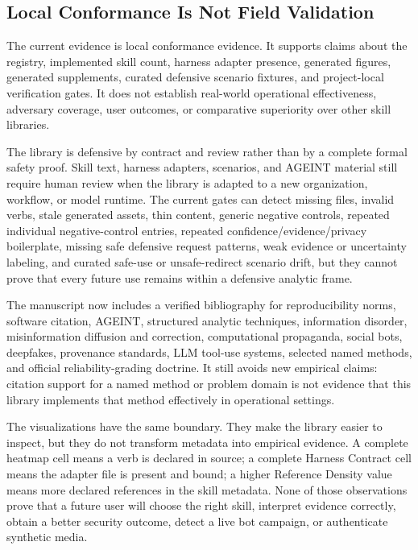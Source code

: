 \documentclass[
]{article}
\begin{document}
\subsection{Local Conformance Is Not Field
Validation}\label{local-conformance-is-not-field-validation}

The current evidence is local conformance evidence. It supports claims
about the registry, implemented skill count, harness adapter presence,
generated figures, generated supplements, curated defensive scenario
fixtures, and project-local verification gates. It does not establish
real-world operational effectiveness, adversary coverage, user outcomes,
or comparative superiority over other skill libraries.

The library is defensive by contract and review rather than by a
complete formal safety proof. Skill text, harness adapters, scenarios,
and AGEINT material still require human review when the library is
adapted to a new organization, workflow, or model runtime. The current
gates can detect missing files, invalid verbs, stale generated assets,
thin content, generic negative controls, repeated individual
negative-control entries, repeated confidence/evidence/privacy
boilerplate, missing safe defensive request patterns, weak evidence or
uncertainty labeling, and curated safe-use or unsafe-redirect scenario
drift, but they cannot prove that every future use remains within a
defensive analytic frame.

The manuscript now includes a verified bibliography for reproducibility
norms, software citation, AGEINT, structured analytic techniques,
information disorder, misinformation diffusion and correction,
computational propaganda, social bots, deepfakes, provenance standards,
LLM tool-use systems, selected named methods, and official
reliability-grading doctrine. It still avoids new empirical claims:
citation support for a named method or problem domain is not evidence
that this library implements that method effectively in operational
settings.

The visualizations have the same boundary. They make the library easier
to inspect, but they do not transform metadata into empirical evidence.
A complete heatmap cell means a verb is declared in source; a complete
Harness Contract cell means the adapter file is present and bound; a
higher Reference Density value means more declared references in the
skill metadata. None of those observations prove that a future user will
choose the right skill, interpret evidence correctly, obtain a better
security outcome, detect a live bot campaign, or authenticate synthetic
media.
\end{document}
